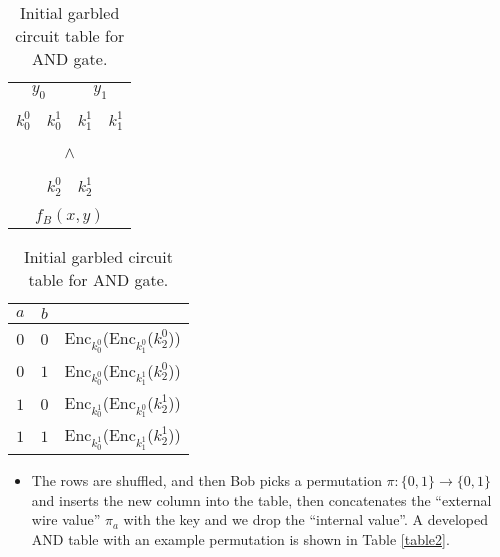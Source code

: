 \documentclass[11pt]{article}
\begin{document}
\begin{table}[ht]\centering
\begin{minipage}[b]{0.4\linewidth}\centering
\begin{tabular}{l l l l}
 \multicolumn{2}{c}{$y_0$} & \multicolumn{2}{c}{$y_1$} \\
 \multicolumn{1}{c|}{} & \multicolumn{1}{c}{} & \multicolumn{1}{c|}{} & \multicolumn{1}{c}{} \\
 \multicolumn{1}{c|}{$k_0^0$} & \multicolumn{1}{c}{$k_0^1$} & \multicolumn{1}{c|}{$k_1^1$} & \multicolumn{1}{c}{$k_1^1$} \\
 \multicolumn{1}{c|}{} & \multicolumn{1}{c}{} & \multicolumn{1}{c|}{} & \multicolumn{1}{c}{} \\ \hline
 \multicolumn{4}{|c|}{} \\
 \multicolumn{4}{|c|}{$\wedge$} \\
 \multicolumn{4}{|c|}{} \\ \hline
 \multicolumn{1}{c}{} & \multicolumn{1}{c|}{} & \multicolumn{1}{c}{} & \multicolumn{1}{c}{} \\
 \multicolumn{1}{c}{} & \multicolumn{1}{c|}{$k_2^0$} & \multicolumn{1}{c}{$k_2^1$} & \multicolumn{1}{c}{} \\
 \multicolumn{1}{c}{} & \multicolumn{1}{c|}{} & \multicolumn{1}{c}{} & \multicolumn{1}{c}{} \\
 \multicolumn{4}{c}{$f_B(x,y)$} \\
\end{tabular}
\label{AND}
\caption*{AND gate with its corresponding wire keys.}
\end{minipage}
\hspace{0.5cm}
\begin{minipage}[b]{0.4\linewidth}\centering
\setlength{\extrarowheight}{6pt}
\begin{tabular}{c c | l}
 $a$ & $b$ &  \\ \hline
 $0$ & $0$ & Enc$_{k^0_0}$(Enc$_{k^0_1}$($k^0_2$)) \\
 $0$ & $1$ & Enc$_{k^0_0}$(Enc$_{k^1_1}$($k^0_2$)) \\
 $1$ & $0$ & Enc$_{k^1_0}$(Enc$_{k^0_1}$($k^1_2$)) \\
 $1$ & $1$ & Enc$_{k^1_0}$(Enc$_{k^1_1}$($k^1_2$))
\end{tabular}
\caption{Initial garbled circuit table for AND gate.}
\label{initial}
\end{minipage}
\end{table}

\begin{itemize}
 \item The rows are shuffled, and then Bob picks a permutation $\pi \colon \{0,1\} \rightarrow \{0,1\}$ and inserts the new column into the table, then concatenates the ``external wire value'' $\pi_a$ with the key and we drop the ``internal value''. A developed AND table with an example permutation is shown in Table \ref{table2}.
\end{itemize}
\end{document}
